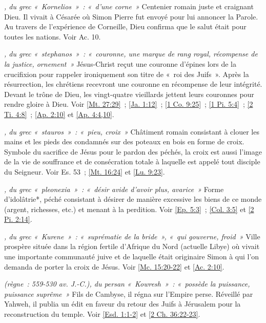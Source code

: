 \begin{multicols}{2}
\textit{, du grec «~Kornelios~»~: «~d'une corne~»}\newline
Centenier romain juste et craignant Dieu. Il vivait à Césarée où Simon Pierre fut envoyé pour lui annoncer la Parole. Au travers de l'expérience de Corneille, Dieu confirma que le salut était pour toutes les nations. Voir Ac. 10.

\textit{, du grec «~stephanos~»~: «~couronne, une marque de rang royal, récompense de la justice, ornement~»}\newline
Jésus-Christ reçut une couronne d'épines lors de la crucifixion pour rappeler ironiquement son titre de «~roi des Juifs~». Après la résurrection, les chrétiens recevront une couronne en récompense de leur intégrité. Devant le trône de Dieu, les vingt-quatre vieillards jettent leurs couronnes pour rendre gloire à Dieu. Voir \vref{Mt. 27:29}~; \vref{Ja. 1:12}~; \vref{1 Co. 9:25}~; \vref{1 Pi. 5:4}~; \vref{2 Ti. 4:8}~; \vref{Ap. 2:10} et \vref{Ap. 4:4,10}.

\textit{, du grec «~stauros~»~: «~pieu, croix~»}\newline
Châtiment romain consistant à clouer les mains et les pieds des condamnés sur des poteaux en bois en forme de croix. Symbole du sacrifice de Jésus pour le pardon des péchés, la croix est aussi l'image de la vie de souffrance et de consécration totale à laquelle est appelé tout disciple du Seigneur. Voir Es. 53~; \vref{Mt. 16:24} et \vref{Lu. 9:23}.

\textit{, du grec «~pleonexia~»~: «~désir avide d'avoir plus, avarice~»}\newline
Forme d'idolâtrie*, péché consistant à désirer de manière excessive les biens de ce monde (argent, richesses, etc.) et menant à la perdition. Voir \vref{Ep. 5:3}~; \vref{Col. 3:5} et \vref{2 Pi. 2:14}.

\textit{, du grec «~Kurene~»~: «~suprématie de la bride~», «~qui gouverne, froid~»}\newline
Ville prospère située dans la région fertile d'Afrique du Nord (actuelle Libye) où vivait une importante communauté juive et de laquelle était originaire Simon à qui l'on demanda de porter la croix de Jésus. Voir \vref{Mc. 15:20-22} et \vref{Ac. 2:10}.

\textit{(règne~: 559-530 av. J.-C.), du persan «~Kowresh~»~: «~possède la puissance, puissance suprême~»}\newline
Fils de Cambyse, il régna sur l'Empire perse. Réveillé par Yahweh, il publia un édit en faveur du retour des Juifs à Jérusalem pour la reconstruction du temple. Voir \vref{Esd. 1:1-2} et \vref{2 Ch. 36:22-23}.


\end{multicols}
